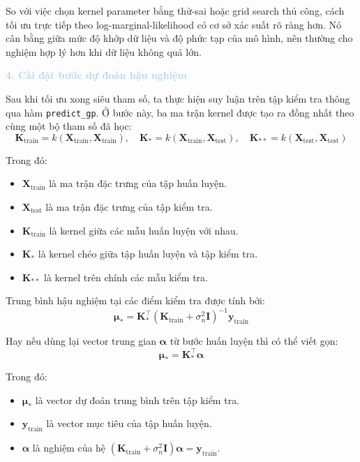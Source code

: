 So với việc chọn kernel parameter bằng thử-sai hoặc grid search thủ công, cách tối ưu trực tiếp theo log-marginal-likelihood có cơ sở xác suất rõ ràng hơn. Nó cân bằng giữa mức độ khớp dữ liệu và độ phức tạp của mô hình, nên thường cho nghiệm hợp lý hơn khi dữ liệu không quá lớn.

\noindent\textcolor{lightblue}{\textbf{4. Cài đặt bước dự đoán hậu nghiệm}}

Sau khi tối ưu xong siêu tham số, ta thực hiện suy luận trên tập kiểm tra thông qua hàm \texttt{predict\_gp}. Ở bước này, ba ma trận kernel được tạo ra đồng nhất theo cùng một bộ tham số đã học:
\begin{equation}
    \mathbf{K}_{\mathrm{train}} = k(\mathbf{X}_{\mathrm{train}}, \mathbf{X}_{\mathrm{train}}), \quad
    \mathbf{K}_{*} = k(\mathbf{X}_{\mathrm{train}}, \mathbf{X}_{\mathrm{test}}), \quad
    \mathbf{K}_{**} = k(\mathbf{X}_{\mathrm{test}}, \mathbf{X}_{\mathrm{test}})
\end{equation}

Trong đó:
\begin{itemize}
    \item $\mathbf{X}_{\mathrm{train}}$ là ma trận đặc trưng của tập huấn luyện.
    \item $\mathbf{X}_{\mathrm{test}}$ là ma trận đặc trưng của tập kiểm tra.
    \item $\mathbf{K}_{\mathrm{train}}$ là kernel giữa các mẫu huấn luyện với nhau.
    \item $\mathbf{K}_{*}$ là kernel chéo giữa tập huấn luyện và tập kiểm tra.
    \item $\mathbf{K}_{**}$ là kernel trên chính các mẫu kiểm tra.
\end{itemize}

Trung bình hậu nghiệm tại các điểm kiểm tra được tính bởi:
\begin{equation}
    \boldsymbol{\mu}_{*} = \mathbf{K}_{*}^{\top}(\mathbf{K}_{\mathrm{train}} + \sigma_n^2\mathbf{I})^{-1}\mathbf{y}_{\mathrm{train}}
\end{equation}

Hay nếu dùng lại vector trung gian $\boldsymbol{\alpha}$ từ bước huấn luyện thì có thể viết gọn:
\begin{equation}
    \boldsymbol{\mu}_{*} = \mathbf{K}_{*}^{\top}\boldsymbol{\alpha}
\end{equation}

Trong đó:
\begin{itemize}
    \item $\boldsymbol{\mu}_{*}$ là vector dự đoán trung bình trên tập kiểm tra.
    \item $\mathbf{y}_{\mathrm{train}}$ là vector mục tiêu của tập huấn luyện.
    \item $\boldsymbol{\alpha}$ là nghiệm của hệ $(\mathbf{K}_{\mathrm{train}} + \sigma_n^2\mathbf{I})\boldsymbol{\alpha} = \mathbf{y}_{\mathrm{train}}$.
\end{itemize}

